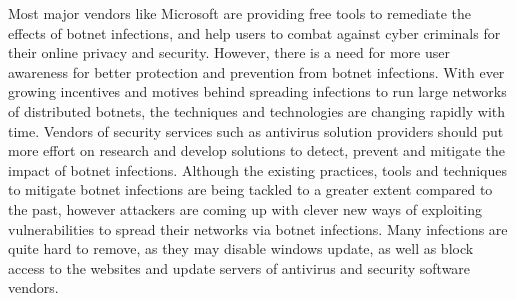 Most major vendors like Microsoft are providing free tools to remediate the effects of botnet infections, and help users to combat against cyber criminals for their online privacy and security. However, there is a need for more user awareness for better protection and prevention from botnet infections. With ever growing incentives and motives behind spreading infections to run large networks of distributed botnets, the techniques and technologies are changing rapidly with time. Vendors of security services such as antivirus solution providers should put more effort on research and develop solutions to detect, prevent and mitigate the impact of botnet infections. Although the existing practices, tools and techniques to mitigate botnet infections are being tackled to a greater extent compared to the past, however attackers are coming up with clever new ways of exploiting vulnerabilities to spread their networks via botnet infections. Many infections are quite hard to remove, as they may disable windows
update, as well as block access to the websites and update servers of antivirus and security software vendors. 
